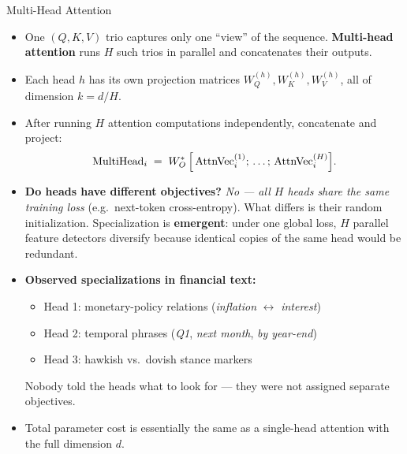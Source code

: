 \begin{frame}{Multi-Head Attention}
\begin{itemize}
\item One $(Q, K, V)$ trio captures only one ``view'' of the sequence. \textbf{Multi-head attention} runs $H$ such trios in parallel and concatenates their outputs.

\medskip
\item Each head $h$ has its own projection matrices $W_{Q}^{(h)}, W_{K}^{(h)}, W_{V}^{(h)}$, all of dimension $k = d/H$.

\medskip
\item After running $H$ attention computations independently, concatenate and project:
\[
   \text{MultiHead}_{i} \;=\; W_{O}^{*}\,\Bigl[\,\text{AttnVec}_{i}^{(1)};\,\ldots;\,\text{AttnVec}_{i}^{(H)}\Bigr].
\]

\medskip
\item \textbf{Do heads have different objectives?} \emph{No --- all $H$ heads share the same training loss} (e.g.\ next-token cross-entropy). What differs is their random initialization. Specialization is \textbf{emergent}: under one global loss, $H$ parallel feature detectors diversify because identical copies of the same head would be redundant.

\medskip
\item \textbf{Observed specializations in financial text:}
\begin{itemize}
    \item Head 1: monetary-policy relations (\emph{inflation} $\leftrightarrow$ \emph{interest})
    \item Head 2: temporal phrases (\emph{Q1}, \emph{next month}, \emph{by year-end})
    \item Head 3: hawkish vs.\ dovish stance markers
\end{itemize}
Nobody told the heads what to look for --- they were not assigned separate objectives.

\medskip
\item Total parameter cost is essentially the same as a single-head attention with the full dimension $d$.
\end{itemize}
\end{frame}

